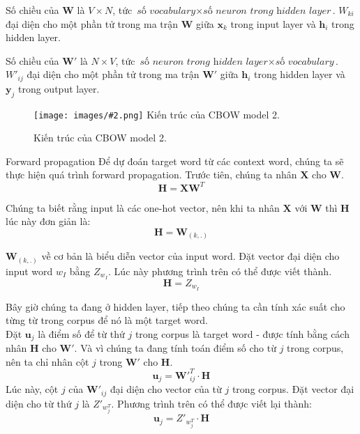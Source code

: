 \documentclass[12pt]{article}
\makeatletter
\renewcommand\paragraph{\@startsection{paragraph}{4}{\z@}
            {-2.5ex\@plus -1ex \@minus -.25ex}
            {1.25ex \@plus .25ex}
            {\normalfont\normalsize\bfseries}}
\newcommand{\includeImage}[3]{
\begin{figure}[H]
  \centering
  \texttt{[image: images/\#2.png]}
  \def\temp{#3}\ifx\temp\empty\else\caption{#3}\fi
\end{figure}}
\makeatother
\begin{document}
\vskip 0.5cm
\indent Số chiều của $\boldsymbol{W}$ là $V \times N$, tức $\textit{số vocabulary} \times \textit{số neuron trong hidden layer}$. $W_{ki}$ đại diện cho một phần tử trong ma trận $\boldsymbol{W}$ giữa $\boldsymbol{x}_k$ trong input layer và $\boldsymbol{h}_i$ trong hidden layer.

\vskip 0.5cm
\indent Số chiều của $\boldsymbol{W'}$ là $N \times V$, tức $\textit{số neuron trong hidden layer} \times \textit{số vocabulary}$. $W'_{ij}$ đại diện cho một phần tử trong ma trận $\boldsymbol{W'}$ giữa $\boldsymbol{h}_i$ trong hidden layer và $\boldsymbol{y}_j$ trong output layer.
     
\includeImage{0.7}{07}{Kiến trúc của CBOW model 2.}

\paragraph{Forward propagation}
Để dự đoán target word từ các context word, chúng ta sẽ thực hiện quá trình forward propagation. Trước tiên, chúng ta nhân $\boldsymbol{X}$ cho $\boldsymbol{W}$.
$$\boldsymbol{H} = \boldsymbol{XW}^T$$

\indent Chúng ta biết rằng input là các one-hot vector, nên khi ta nhân $\boldsymbol{X}$ với $\boldsymbol{W}$ thì $\boldsymbol{H}$ lúc này đơn giản là:
$$\boldsymbol{H} = \boldsymbol{W}_{(k,.)}$$

\indent $\boldsymbol{W}_{(k,.)}$ về cơ bản là biểu diễn vector của input word. Đặt vector đại diện cho input word $w_I$ bằng $Z_{w_I}$. Lúc này phương trình trên có thể được viết thành.\\
\begin{equation}
  \boldsymbol{H} = Z_{w_I}
\end{equation}

\indent Bây giờ chúng ta đang ở hidden layer, tiếp theo chúng ta cần tính xác suất cho từng từ trong corpus để nó là một target word.\\

\indent Đặt $\boldsymbol{u}_j$ là điểm số để từ thứ $j$ trong corpus là target word - được tính bằng cách nhân $\boldsymbol{H}$ cho $\boldsymbol{W'}$. Và vì chúng ta đang tính toán điểm số cho từ $j$ trong corpus, nên ta chỉ nhân cột $j$ trong $\boldsymbol{W'}$ cho $\boldsymbol{H}$.
$$\boldsymbol{u}_j = \boldsymbol{W'}_{ij}^T \cdot \boldsymbol{H}$$
\indent Lúc này, cột $j$ của $\boldsymbol{W'}_{ij}$ đại diện cho vector của từ $j$ trong corpus. Đặt vector đại diện cho từ thứ $j$ là $Z'_{w_j^T}$. Phương trình trên có thể được viết lại thành:
\begin{equation}
  \boldsymbol{u}_j = Z'_{w_j^T} \cdot \boldsymbol{H}
\end{equation}
\end{document}
